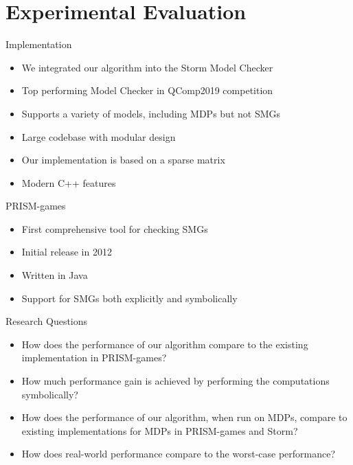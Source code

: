 \section{Experimental Evaluation}

\begin{frame}{Implementation}
\begin{itemize}[<+->]
    \item We integrated our algorithm into the Storm Model Checker
    \item Top performing Model Checker in QComp2019 competition
    \item Supports a variety of models, including MDPs but not SMGs
    \item Large codebase with modular design
    \item Our implementation is based on a sparse matrix
    \item Modern C++ features
\end{itemize}

    
\end{frame}

\begin{frame}{PRISM-games}

\begin{itemize}[<+->]
    \item First comprehensive tool for checking SMGs
    \item Initial release in 2012
    \item Written in Java
    \item Support for SMGs both explicitly and symbolically
\end{itemize}

\end{frame}

\begin{frame}{Research Questions}
    \begin{itemize}[<+->]
    \item[\textbf{RQ1}:] How does the performance of our algorithm compare to the existing implementation in PRISM-games?
    \item[\textbf{RQ2}:] How much performance gain is achieved by performing the computations symbolically?
    \item[\textbf{RQ3}:] How does the performance of our algorithm, when run on MDPs, compare to existing implementations for MDPs in PRISM-games and Storm?
    \item[\textbf{RQ4}:] How does real-world performance compare to the worst-case performance?
\end{itemize}
\end{frame}

